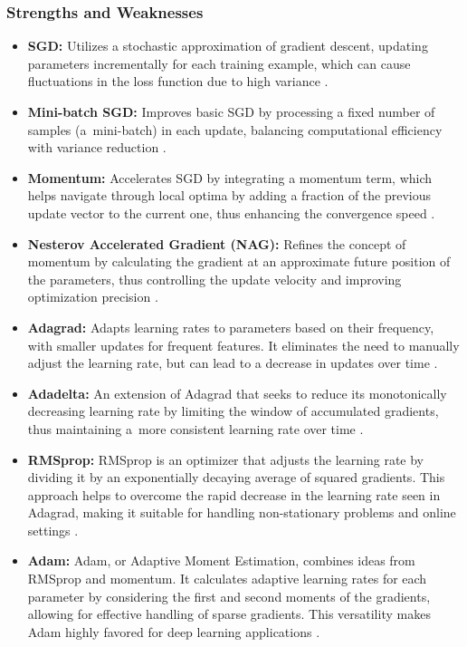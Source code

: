 \subsubsection{Strengths and Weaknesses}
\begin{itemize}
    \item \textbf{SGD:} Utilizes a stochastic approximation of gradient descent, updating parameters incrementally for each training example, which can cause fluctuations in the loss function due to high variance \cite{Perin2020Influence}.
    \item \textbf{Mini-batch SGD:} Improves basic SGD by processing a fixed number of samples (a~mini-batch) in each update, balancing computational efficiency with variance reduction \cite{Perin2020Influence}.
    \item \textbf{Momentum:} Accelerates SGD by integrating a momentum term, which helps navigate through local optima by adding a fraction of the previous update vector to the current one, thus enhancing the convergence speed \cite{Perin2020Influence}.
    \item \textbf{Nesterov Accelerated Gradient (NAG):} Refines the concept of momentum by calculating the gradient at an approximate future position of the parameters, thus controlling the update velocity and improving optimization precision \cite{Perin2020Influence}.
    \item \textbf{Adagrad:} Adapts learning rates to parameters based on their frequency, with smaller updates for frequent features. It eliminates the need to manually adjust the learning rate, but can lead to a decrease in updates over time \cite{Perin2020Influence}.
    \item \textbf{Adadelta:} An extension of Adagrad that seeks to reduce its monotonically decreasing learning rate by limiting the window of accumulated gradients, thus maintaining a~more consistent learning rate over time \cite{Perin2020Influence}.
    \item \textbf{RMSprop:} RMSprop is an optimizer that adjusts the learning rate by dividing it by an exponentially decaying average of squared gradients. This approach helps to overcome the rapid decrease in the learning rate seen in Adagrad, making it suitable for handling non-stationary problems and online settings \cite{Perin2020Influence}.
    \item \textbf{Adam:} Adam, or Adaptive Moment Estimation, combines ideas from RMSprop and momentum. It calculates adaptive learning rates for each parameter by considering the first and second moments of the gradients, allowing for effective handling of sparse gradients. This versatility makes Adam highly favored for deep learning applications \cite{Perin2020Influence}.
\end{itemize}

